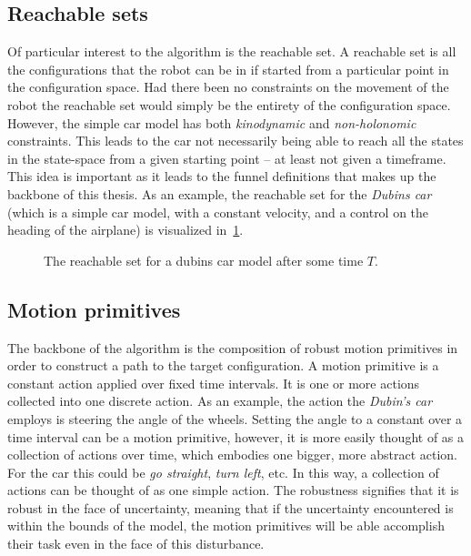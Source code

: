 \subsection{Reachable sets}
\label{subsec:reachable-set}

Of particular interest to the \rrtfunnel{} algorithm is the reachable set. A
reachable set is all the configurations that the robot can be in if started from
a particular point in the configuration space. Had there been no constraints on
the movement of the robot the reachable set would simply be the entirety of the
configuration space. However, the simple car model has both \textit{kinodynamic}
and \textit{non-holonomic} constraints. This leads to the car not necessarily
being able to reach all the states in the state-space from a given starting
point -- at least not given a timeframe. This idea is important as it leads to
the funnel definitions that makes up the backbone of this thesis. As an example,
the reachable set for the \textit{Dubins car} (which is a simple car model, with
a constant velocity, and a control on the heading of the airplane) is visualized
in~\cref{fig:reachable-set-dubin}.

\begin{figure}
  \centering 
  \caption{The reachable set for a dubins car model after some time \(T\).}
  \label{fig:reachable-set-dubin}
\end{figure}

\subsection{Motion primitives}

The backbone of the \rrtfunnel{} algorithm is the composition of robust motion
primitives in order to construct a path to the target configuration. A motion
primitive is a constant action applied over fixed time intervals. It is one or
more actions collected into one discrete action. As an example, the action the
\textit{Dubin's car} employs is steering the angle of the wheels. Setting the
angle to a constant over a time interval can be a motion primitive, however, it
is more easily thought of as a collection of actions over time, which embodies
one bigger, more abstract action. For the car this could be \textit{go
  straight}, \textit{turn left}, etc. In this way, a collection of actions can
be thought of as one simple action. The robustness signifies that it is robust
in the face of uncertainty, meaning that if the uncertainty encountered is
within the bounds of the model, the motion primitives will be able accomplish
their task even in the face of this disturbance.

